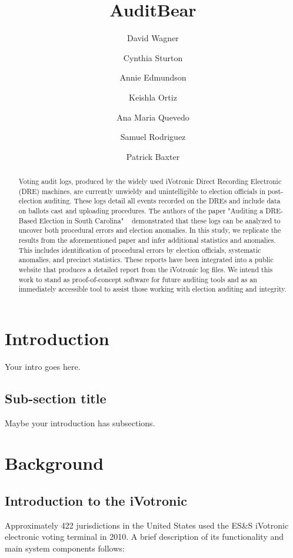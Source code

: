 \documentclass[letterpaper,twocolumn,10pt]{article}
\begin{document}
\title{AuditBear}
\author{David Wagner
\and Cynthia Sturton
\and Annie Edmundson
\and Keishla Ortiz
\and Ana Maria Quevedo
\and Samuel Rodriguez
\and Patrick Baxter}
\maketitle
\begin{abstract}
Voting audit logs, produced by the widely used iVotronic Direct Recording Electronic (DRE) machines, are currently unwieldy and unintelligible to election officials in post-election auditing. These logs detail all events recorded on the DREs and include data on ballots cast and uploading procedures. The authors of the paper "Auditing a DRE-Based Election in South Carolina" ~\cite{Buell2011} demonstrated that these logs can be analyzed to uncover both procedural errors and  election anomalies.  In this study, we replicate the results from the aforementioned paper and infer additional statistics and anomalies. This includes identification of procedural errors by election officials, systematic anomalies, and precinct statistics. These reports have been integrated into a public website that produces a detailed report from the iVotronic log files.  We intend this work to stand as proof-of-concept software for future auditing tools and as an immediately accessible tool to assist those working with election auditing and integrity.
\end{abstract}

\section{Introduction}
Your intro goes here.

\subsection{Sub-section title}
Maybe your introduction has subsections.
\section{Background}

\subsection{Introduction to the iVotronic}
Approximately 422 jurisdictions in the United States used the ES\&S iVotronic electronic voting terminal in 2010.  A brief description of  its functionality and main system components follows:
\end{document}
